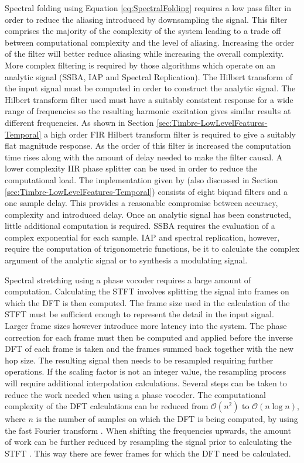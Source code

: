 		Spectral folding using Equation \ref{eq:SpectralFolding} requires a low pass filter in order to reduce the
		aliasing introduced by downsampling the signal. This filter comprises the majority of the complexity of the
		system leading to a trade off between computational complexity and the level of aliasing. Increasing the
		order of the filter will better reduce aliasing while increasing the overall complexity. More complex
		filtering is required by those algorithms which operate on an analytic signal (SSBA, IAP and Spectral
		Replication). The Hilbert transform of the input signal must be computed in order to construct the analytic
		signal. The Hilbert transform filter used must have a suitably consistent response for a wide range of
		frequencies so the resulting harmonic excitation gives similar results at different frequencies. As shown in
		Section \ref{sec:Timbre-LowLevelFeatures-Temporal} a high order FIR Hilbert transform filter is required to
		give a suitably flat magnitude response. As the order of this filter is increased the computation time rises
		along with the amount of delay needed to make the filter causal. A lower complexity IIR phase splitter can
		be used in order to reduce the computational load. The implementation given by \citet{niemitalo2003hilbert}
		(also discussed in Section \ref{sec:Timbre-LowLevelFeatures-Temporal}) consists of eight biquad filters and
		a one sample delay. This provides a reasonable compromise between accuracy, complexity and introduced delay.
		Once an analytic signal has been constructed, little additional computation is required. SSBA requires the
		evaluation of a complex exponential for each sample. IAP and spectral replication, however, require the
		computation of trigonometric functions, be it to calculate the complex argument of the analytic signal or to
		synthesis a modulating signal.

		Spectral stretching using a phase vocoder requires a large amount of computation. Calculating the STFT
		involves splitting the signal into frames on which the DFT is then computed. The frame size used in the
		calculation of the STFT must be sufficient enough to represent the detail in the input signal. Larger frame
		sizes however introduce more latency into the system. The phase correction for each frame must then be
		computed and applied before the inverse DFT of each frame is taken and the frames summed back together with
		the new hop size. The resulting signal then needs to be resampled requiring further operations. If the
		scaling factor is not an integer value, the resampling process will require additional interpolation
		calculations. Several steps can be taken to reduce the work needed when using a phase vocoder. The
		computational complexity of the DFT calculations can be reduced from $\mathcal{O} \left( n^{2} \right)$ to
		$\mathcal{O}(n\log{n})$, where $n$ is the number of samples on which the DFT is being computed, by using the
		fast Fourier transform \citep{portnoff1976implementation}. When shifting the frequencies upwards, the amount
		of work can be further reduced by resampling the signal prior to calculating the STFT
		\citep{laroche1999new}. This way there are fewer frames for which the DFT need be calculated.

